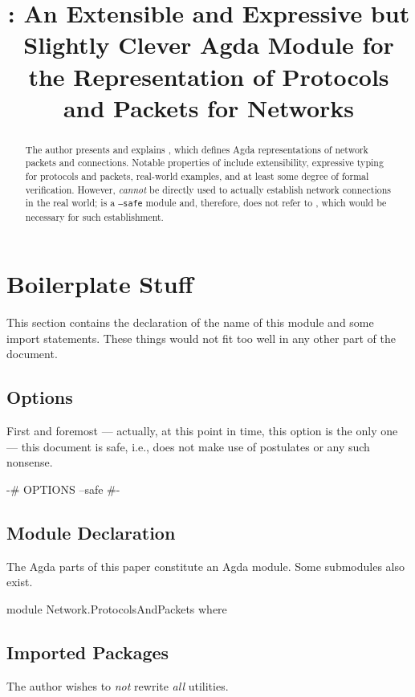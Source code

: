 \documentclass{report}
\title{\AgdaModule{Network.ProtocolsAndPackets}: An Extensible and Expressive but Slightly Clever Agda Module for the Representation of Protocols and Packets for Networks}
\begin{document}
\maketitle{}

\begin{abstract}
The author presents and explains , which defines Agda representations of network packets and connections.  Notable properties of  include extensibility, expressive typing for protocols and packets, real-world examples, and at least some degree of formal verification.  However,  \emph{cannot} be directly used to actually establish network connections in the real world;  is a \texttt{--safe} module and, therefore, does not refer to , which would be necessary for such establishment.
\end{abstract}

\chapter{Boilerplate Stuff}
This section contains the declaration of the name of this module and some import statements.  These things would not fit too well in any other part of the document.

\section{Options}
First and foremost --- actually, at this point in time, this option is the only one --- this document is safe, i.e., does not make use of postulates or any such nonsense.

\begin{code}
{-# OPTIONS --safe #-}
\end{code}

\section{Module Declaration}
The Agda parts of this paper constitute an Agda module.  Some submodules also exist.

\begin{code}
module Network.ProtocolsAndPackets where
\end{code}

\section{Imported Packages}
The author wishes to \emph{not} rewrite \emph{all} utilities.
\end{document}
